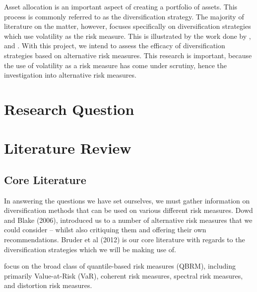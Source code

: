 \documentclass[12pt,a4paper]{article}
\begin{document}
Asset allocation is an important aspect of creating a portfolio of assets. This process is commonly referred to as the diversification strategy. The majority of literature on the matter, however, focuses specifically on diversification strategies which use volatility as the risk measure. This is illustrated by the work done by \cite{chow2011survey}, and \cite{CHEN20111179}. With this project, we intend to assess the efficacy of diversification strategies based on alternative risk measures.
This research is important, because the use of volatility as a risk measure has come under scrutiny, hence the investigation into alternative risk measures.




\section{Research Question}
\label{sec:ResQues}


\section{Literature Review}
\label{sec:LitRev}

\subsection{Core Literature}
\label{subsec:CorLit}

In answering the questions we have set ourselves, we must gather information on diversification methods that can be used on various different risk measures. Dowd and Blake (2006), introduced us to a number of alternative risk measures that we could consider – whilst also critiquing them and offering their own recommendations. Bruder et al (2012) is our core literature with regards to the diversification strategies which we will be making use of.

\cite{dowd2006after} focus on the broad class of quantile-based risk measures (QBRM), including primarily Value-at-Risk (VaR), coherent risk measures, spectral risk measures, and distortion risk measures.
\end{document}
